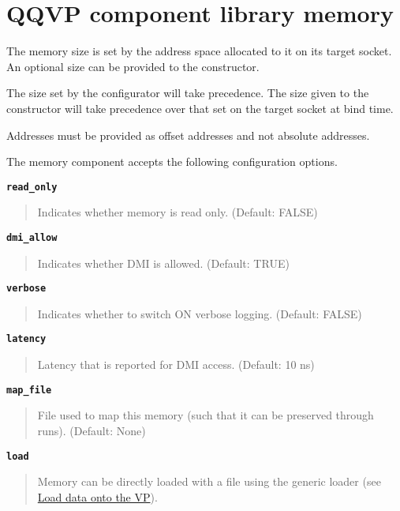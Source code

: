 \clearpage
\section{QQVP component library memory}

The memory size is set by the address space allocated to it on its target socket. An optional size can be provided to the constructor.

The size set by the configurator will take precedence. The size given to the constructor will take precedence over that set on the target socket at bind time.

\note Addresses must be provided as offset addresses and not absolute addresses.

The memory component accepts the following configuration options.

{\textbf {\footnotesize{\lstinline!read_only!}}}
\vspace{-2pt}
\begin{quote}
Indicates whether memory is read only. (Default: FALSE)
\end{quote}


{\textbf {\footnotesize{\lstinline!dmi_allow!}}}
\vspace{-2pt}
\begin{quote}
Indicates whether DMI is allowed. (Default: TRUE)
\end{quote}


{\textbf {\footnotesize{\lstinline!verbose!}}}
\vspace{-2pt}
\begin{quote}
Indicates whether to switch ON verbose logging. (Default: FALSE)
\end{quote}


{\textbf {\footnotesize{\lstinline!latency!}}}
\vspace{-2pt}
\begin{quote}
Latency that is reported for DMI access. (Default: 10 ns)
\end{quote}


{\textbf {\footnotesize{\lstinline!map_file!}}}
\vspace{-2pt}
\begin{quote}
File used to map this memory (such that it can be preserved through runs). (Default: None)
\end{quote}


{\textbf {\footnotesize{\lstinline!load!}}}
\vspace{-2pt}
\begin{quote}
Memory can be directly loaded with a file using the generic loader (see \hyperref[sec:load-data-on-vp]{Load data onto the VP}).
\end{quote}


